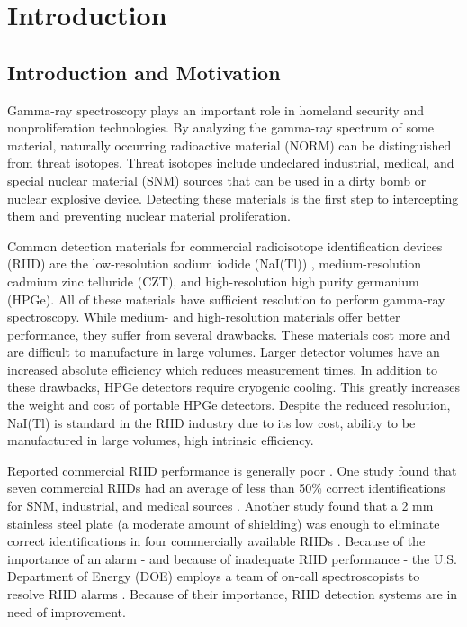 \chapter{Introduction}

\section{Introduction and Motivation}

Gamma-ray spectroscopy plays an important role in homeland security and nonproliferation technologies. By analyzing the gamma-ray spectrum of some material, naturally occurring radioactive material (NORM) can be distinguished from threat isotopes. Threat isotopes include undeclared industrial, medical, and special nuclear material (SNM) sources that can be used in a dirty bomb or nuclear explosive device. Detecting these materials is the first step to intercepting them and preventing nuclear material proliferation.


Common detection materials for commercial radioisotope identification devices (RIID) are the low-resolution sodium iodide (NaI(Tl)) \cite{Hofstadter1948}, medium-resolution cadmium zinc telluride (CZT), and high-resolution high purity germanium (HPGe). All of these materials have sufficient resolution to perform gamma-ray spectroscopy. While medium- and high-resolution materials offer better performance, they suffer from several drawbacks. These materials cost more and are difficult to manufacture in large volumes. Larger detector volumes have an increased absolute efficiency which reduces measurement times. In addition to these drawbacks, HPGe detectors require cryogenic cooling. This greatly increases the weight and cost of portable HPGe detectors. Despite the reduced resolution, NaI(Tl) is standard in the RIID industry due to its low cost, ability to be manufactured in large volumes, high intrinsic efficiency. 

Reported commercial RIID performance is generally poor \cite{pibida2004,blackadar2003,blackadar2004}. One study found that seven commercial RIIDs had an average of less than 50\% correct identifications for SNM, industrial, and medical sources \cite{blackadar2003}. Another study found that a 2 mm stainless steel plate (a moderate amount of shielding) was enough to eliminate correct identifications in four commercially available RIIDs \cite{pibida2004}. Because of the importance of an alarm - and because of inadequate RIID performance - the U.S. Department of Energy (DOE) employs a team of on-call spectroscopists to resolve RIID alarms \cite{burr2009}. Because of their importance, RIID detection systems are in need of improvement.

